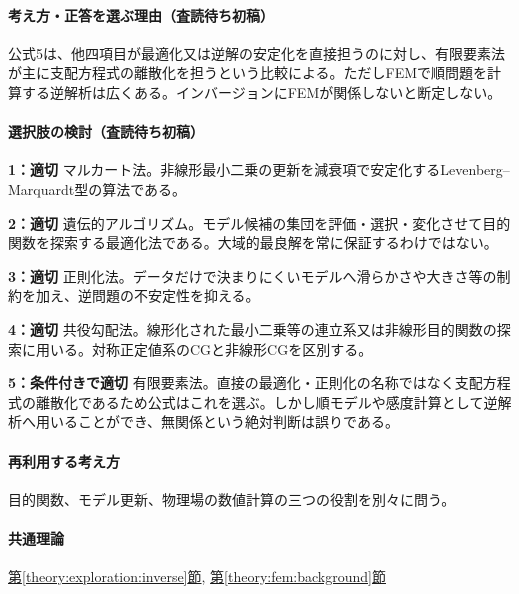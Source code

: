 \paragraph{考え方・正答を選ぶ理由（査読待ち初稿）} 公式5は、他四項目が最適化又は逆解の安定化を直接担うのに対し、有限要素法が主に支配方程式の離散化を担うという比較による。ただしFEMで順問題を計算する逆解析は広くある。インバージョンにFEMが関係しないと断定しない。

\paragraph{選択肢の検討（査読待ち初稿）}\mbox{}\par

\noindent\textbf{1：適切} マルカート法。非線形最小二乗の更新を減衰項で安定化するLevenberg–Marquardt型の算法である。\par

\noindent\textbf{2：適切} 遺伝的アルゴリズム。モデル候補の集団を評価・選択・変化させて目的関数を探索する最適化法である。大域的最良解を常に保証するわけではない。\par

\noindent\textbf{3：適切} 正則化法。データだけで決まりにくいモデルへ滑らかさや大きさ等の制約を加え、逆問題の不安定性を抑える。\par

\noindent\textbf{4：適切} 共役勾配法。線形化された最小二乗等の連立系又は非線形目的関数の探索に用いる。対称正定値系のCGと非線形CGを区別する。\par

\noindent\textbf{5：条件付きで適切} 有限要素法。直接の最適化・正則化の名称ではなく支配方程式の離散化であるため公式はこれを選ぶ。しかし順モデルや感度計算として逆解析へ用いることができ、無関係という絶対判断は誤りである。\par

\paragraph{再利用する考え方} 目的関数、モデル更新、物理場の数値計算の三つの役割を別々に問う。

\paragraph{共通理論} \hyperref[theory:exploration:inverse]{第\ref*{theory:exploration:inverse}節}, \hyperref[theory:fem:background]{第\ref*{theory:fem:background}節}

